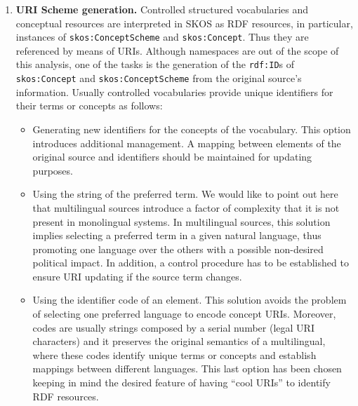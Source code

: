 \begin{enumerate}
 \item \textbf{URI Scheme generation.} Controlled structured vocabularies and conceptual resources are interpreted in SKOS as RDF 
 resources, in particular, instances of \texttt{skos:ConceptScheme} and \texttt{skos:Concept}. Thus they are referenced by 
 means of URIs.  Although namespaces are out of the scope of this analysis, one of the tasks is the generation of 
 the \texttt{rdf:ID}s of \texttt{skos:Concept} and \texttt{skos:ConceptScheme} from the original source's information. 
 Usually controlled vocabularies provide unique identifiers for their terms or concepts as follows:
 \begin{itemize}
  \item Generating new identifiers for the concepts of the vocabulary. This option introduces additional management. 
  A mapping between elements of the original source and identifiers should be maintained for updating purposes.
  \item Using the string of the preferred term. We would like to point out here that multilingual sources introduce a 
  factor of complexity that it is not present in monolingual systems. In multilingual sources, this solution 
  implies selecting a preferred term in a given natural language, thus promoting one language over the others with a 
  possible non-desired political impact. In addition, a control procedure has to be established to ensure URI updating if the source term changes.
  \item Using the identifier code of an element. This solution avoids the problem of selecting one preferred language 
  to encode concept URIs. Moreover, codes are usually strings composed by a serial number 
  (legal URI characters) and it preserves the original semantics of a multilingual,
  where these codes identify unique terms or concepts and establish mappings between different languages. 
  This last option has been chosen keeping in mind the desired feature of having ``cool URIs'' to identify RDF resources.
 \end{itemize}


\end{enumerate}
